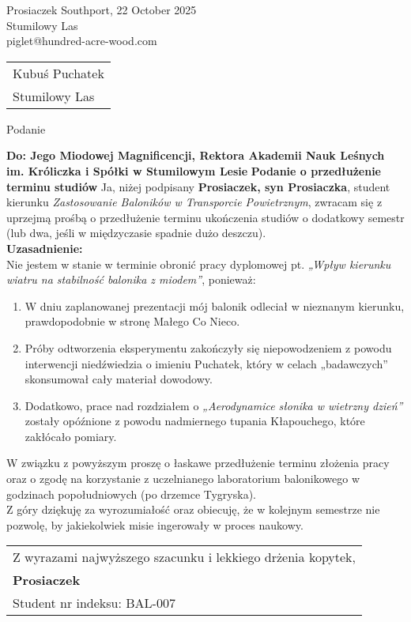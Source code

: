 \documentclass[a4paper,11pt]{article}
\begin{document}
\noindent
Prosiaczek \hfill Southport, 22 October 2025\\
Stumilowy Las\\
piglet@hundred-acre-wood.com

\vskip 1.0cm

\phantom{a}\hfill
\begin{tabular}[c]{@{}l@{}}
Kubuś Puchatek\\
Stumilowy Las
\end{tabular}

\vskip 1.0cm

\begin{center}
{\Large Podanie}
\end{center}

\vskip 0.5cm

\noindent
{\bfseries Do: Jego Miodowej Magnificencji, Rektora Akademii Nauk Leśnych im. Króliczka i Spółki w Stumilowym Lesie}
\vskip 0.5cm
{\bfseries Podanie o przedłużenie terminu studiów}
\vskip 0.5cm
Ja, niżej podpisany {\bfseries Prosiaczek, syn Prosiaczka}, student kierunku {\itshape Zastosowanie Baloników w Transporcie Powietrznym}, zwracam się z uprzejmą prośbą o przedłużenie terminu ukończenia studiów o dodatkowy semestr (lub dwa, jeśli w międzyczasie spadnie dużo deszczu).\\
{\bfseries Uzasadnienie:}\\
Nie jestem w stanie w terminie obronić pracy dyplomowej pt. {\itshape „Wpływ kierunku wiatru na stabilność balonika z miodem”}, ponieważ:
\begin{enumerate}
\item W dniu zaplanowanej prezentacji mój balonik odleciał w nieznanym kierunku, prawdopodobnie w stronę Małego Co Nieco.
\item Próby odtworzenia eksperymentu zakończyły się niepowodzeniem z powodu interwencji niedźwiedzia o imieniu Puchatek, który w celach „badawczych” skonsumował cały materiał dowodowy.
\item Dodatkowo, prace nad rozdziałem o {\itshape „Aerodynamice słonika w wietrzny dzień”} zostały opóźnione z powodu nadmiernego tupania Kłapouchego, które zakłócało pomiary.
\end{enumerate}
W związku z powyższym proszę o łaskawe przedłużenie terminu złożenia pracy oraz o zgodę na korzystanie z uczelnianego laboratorium balonikowego w godzinach popołudniowych (po drzemce Tygryska).\\
Z góry dziękuję za wyrozumiałość oraz obiecuję, że w kolejnym semestrze nie pozwolę, by jakiekolwiek misie ingerowały w proces naukowy.

\vskip 1.0cm

\hspace{\fill}
\begin{tabular}{l}
Z wyrazami najwyższego szacunku i lekkiego drżenia kopytek,\\
{\bfseries Prosiaczek}\\
Student nr indeksu: BAL-007
\end{tabular}
\end{document}
